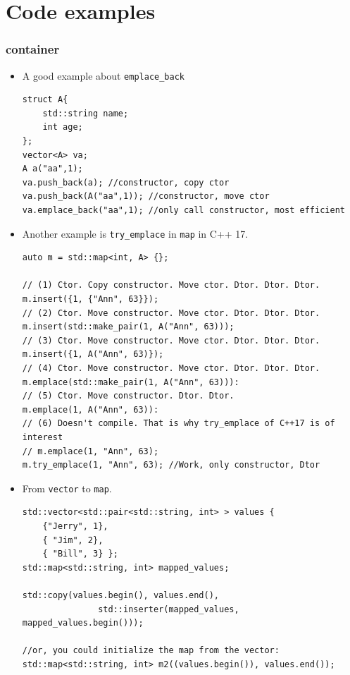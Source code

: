 \documentclass[a4paper,11pt,twoside]{book}
\begin{document}
\section{Code examples}
\subsubsection{container}
\begin{itemize}
\item A good example about \texttt{emplace\_back}
\begin{lstlisting}
struct A{
	std::string name;
	int age;
};
vector<A> va;
A a("aa",1);
va.push_back(a); //constructor, copy ctor
va.push_back(A("aa",1)); //constructor, move ctor
va.emplace_back("aa",1); //only call constructor, most efficient
\end{lstlisting}

\item Another example is \texttt{try\_emplace} in \texttt{map} in C++ 17.

\begin{lstlisting}
auto m = std::map<int, A> {};
 
// (1) Ctor. Copy constructor. Move ctor. Dtor. Dtor. Dtor.
m.insert({1, {"Ann", 63}});
// (2) Ctor. Move constructor. Move ctor. Dtor. Dtor. Dtor.
m.insert(std::make_pair(1, A("Ann", 63)));
// (3) Ctor. Move constructor. Move ctor. Dtor. Dtor. Dtor.
m.insert({1, A("Ann", 63)});
// (4) Ctor. Move constructor. Move ctor. Dtor. Dtor. Dtor.
m.emplace(std::make_pair(1, A("Ann", 63))):
// (5) Ctor. Move constructor. Dtor. Dtor.
m.emplace(1, A("Ann", 63)):
// (6) Doesn't compile. That is why try_emplace of C++17 is of interest
// m.emplace(1, "Ann", 63);
m.try_emplace(1, "Ann", 63); //Work, only constructor, Dtor
\end{lstlisting}

\item From \texttt{vector} to \texttt{map}.

\begin{lstlisting}
std::vector<std::pair<std::string, int> > values {   
	{"Jerry", 1},
	{ "Jim", 2},
	{ "Bill", 3} };
std::map<std::string, int> mapped_values;

std::copy(values.begin(), values.end(), 
               std::inserter(mapped_values, mapped_values.begin()));

//or, you could initialize the map from the vector:
std::map<std::string, int> m2((values.begin()), values.end());
\end{lstlisting}
\end{itemize}
\end{document}
